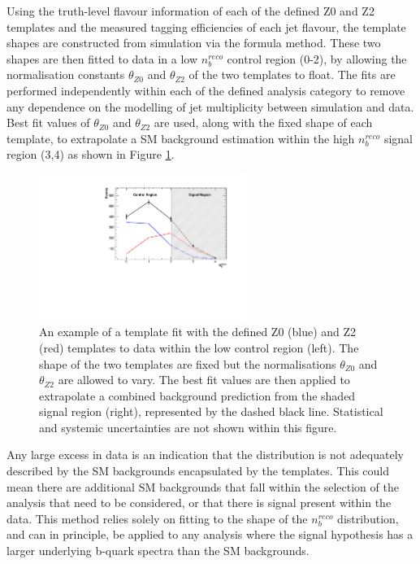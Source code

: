 Using the truth-level flavour information of each of the defined Z0 and Z2 templates and the measured tagging efficiencies of each jet flavour, the template shapes are constructed from simulation via the formula method. These two shapes are then fitted to data in a low $n_{b}^{reco}$ control region (0-2), by allowing the normalisation constants $\theta_{Z0}$ and $\theta_{Z2}$ of the two templates to float. The fits are performed independently within each of the defined analysis category to remove any dependence on the modelling of jet multiplicity between simulation and data. Best fit values of $\theta_{Z0}$ and $\theta_{Z2}$ are used, along with the fixed shape of each template, to extrapolate a \ac{SM} background estimation within the high $n_{b}^{reco}$ signal region (3,4) as shown in Figure \ref{fig:templateexample}. 

 \begin{figure}[!h]
 \centering
\includegraphics[width=0.60\textwidth]{plots/Template_Example.pdf}
\caption[An example of a template fit with the defined Z0 (blue) and Z2 (red) templates to data within the low \nbreco control region (left).]{An example of a template fit with the defined Z0 (blue) and Z2 (red) templates to data within the low \nbreco control region (left). The shape of the two templates are fixed but the normalisations $\theta_{Z0}$ and $\theta_{Z2}$ are allowed to vary. The best fit values are then applied to extrapolate a combined background prediction from the shaded signal region (right), represented by the dashed black line. Statistical and systemic uncertainties are not shown within this figure.}  
\label{fig:templateexample}
\end{figure}

Any large excess in data is an indication that the \nbreco distribution is not adequately described by the \ac{SM} backgrounds encapsulated by the templates. This could mean there are additional \ac{SM} backgrounds that fall within the selection of the analysis that need to be considered, or that there is signal present within the data. This method relies solely on fitting to the shape of the $n_{b}^{reco}$ distribution, and can in principle, be applied to any analysis where the signal hypothesis has a larger underlying b-quark spectra than the \ac{SM} backgrounds. 


